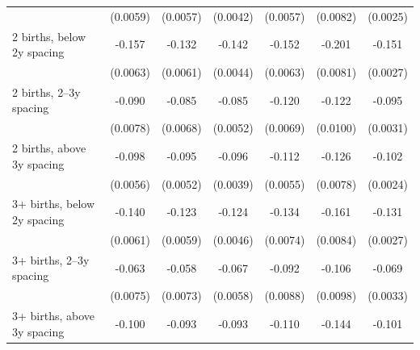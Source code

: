 {\begin{tabular}{l*{6}{c}}
                    &    (0.0059)        &    (0.0057)        &    (0.0042)        &    (0.0057)        &    (0.0082)        &    (0.0025)        \\
\addlinespace
\hspace*{1em}2 births, below 2y spacing&      -0.157\sym{**}&      -0.132\sym{**}&      -0.142\sym{**}&      -0.152\sym{**}&      -0.201\sym{**}&      -0.151\sym{**}\\
                    &    (0.0063)        &    (0.0061)        &    (0.0044)        &    (0.0063)        &    (0.0081)        &    (0.0027)        \\
\addlinespace
\hspace*{1em}2 births, 2–3y spacing&      -0.090\sym{**}&      -0.085\sym{**}&      -0.085\sym{**}&      -0.120\sym{**}&      -0.122\sym{**}&      -0.095\sym{**}\\
                    &    (0.0078)        &    (0.0068)        &    (0.0052)        &    (0.0069)        &    (0.0100)        &    (0.0031)        \\
\addlinespace
\hspace*{1em}2 births, above 3y spacing&      -0.098\sym{**}&      -0.095\sym{**}&      -0.096\sym{**}&      -0.112\sym{**}&      -0.126\sym{**}&      -0.102\sym{**}\\
                    &    (0.0056)        &    (0.0052)        &    (0.0039)        &    (0.0055)        &    (0.0078)        &    (0.0024)        \\
\addlinespace
\hspace*{1em}3+ births, below 2y spacing&      -0.140\sym{**}&      -0.123\sym{**}&      -0.124\sym{**}&      -0.134\sym{**}&      -0.161\sym{**}&      -0.131\sym{**}\\
                    &    (0.0061)        &    (0.0059)        &    (0.0046)        &    (0.0074)        &    (0.0084)        &    (0.0027)        \\
\addlinespace
\hspace*{1em}3+ births, 2–3y spacing&      -0.063\sym{**}&      -0.058\sym{**}&      -0.067\sym{**}&      -0.092\sym{**}&      -0.106\sym{**}&      -0.069\sym{**}\\
                    &    (0.0075)        &    (0.0073)        &    (0.0058)        &    (0.0088)        &    (0.0098)        &    (0.0033)        \\
\addlinespace
\hspace*{1em}3+ births, above 3y spacing&      -0.100\sym{**}&      -0.093\sym{**}&      -0.093\sym{**}&      -0.110\sym{**}&      -0.144\sym{**}&      -0.101\sym{**}\\

\end{tabular}}
